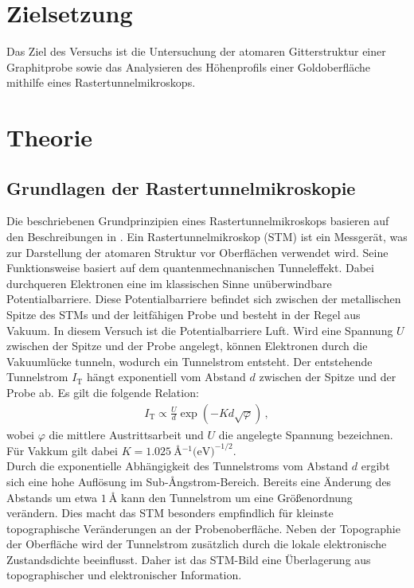 \section{Zielsetzung}
\label{sec:Zielsetzung}
Das Ziel des Versuchs ist die Untersuchung der atomaren Gitterstruktur einer Graphitprobe sowie das Analysieren des Höhenprofils einer Goldoberfläche mithilfe eines Rastertunnelmikroskops.

\section{Theorie}
\label{sec:Theorie}
\subsection{Grundlagen der Rastertunnelmikroskopie}
\label{sec:GrundlagenSTM}
Die beschriebenen Grundprinzipien eines Rastertunnelmikroskops basieren auf den Beschreibungen in \cite{Surfaces}.
Ein Rastertunnelmikroskop (STM) ist ein Messgerät, was zur Darstellung der atomaren Struktur vor Oberflächen verwendet wird.
Seine Funktionsweise basiert auf dem quantenmechnanischen Tunneleffekt. 
Dabei durchqueren Elektronen eine im klassischen Sinne unüberwindbare Potentialbarriere. 
Diese Potentialbarriere befindet sich zwischen der metallischen Spitze des STMs und der leitfähigen Probe und besteht in der Regel aus Vakuum. In diesem Versuch ist die Potentialbarriere Luft.
Wird eine Spannung $U$ zwischen der Spitze und der Probe angelegt, können Elektronen durch die Vakuumlücke tunneln, wodurch ein Tunnelstrom entsteht.
Der entstehende Tunnelstrom $I_{\text{T}}$ hängt exponentiell vom Abstand $d$ zwischen der Spitze und der Probe ab. Es gilt die folgende Relation:
\begin{align}
    I_{\text{T}} \propto \frac{U}{d}\exp\left(-K d \sqrt{\varphi}\right)\,, \label{eqn:Tunnelstrom}
\end{align}
wobei $\varphi$ die mittlere Austrittsarbeit und $U$ die angelegte Spannung bezeichnen. 
Für Vakkum gilt dabei $K = \SI{1.025}{\angstrom^{-1} (\eV)^{-1/2}}$.\\

Durch die exponentielle Abhängigkeit des Tunnelstroms vom Abstand $d$ ergibt sich eine hohe Auflösung im Sub-{\AA}ngstrom-Bereich. 
Bereits eine Änderung des Abstands um etwa $\SI{1}{\angstrom}$ kann den Tunnelstrom um eine Größenordnung verändern. Dies macht das STM besonders empfindlich für kleinste topographische Veränderungen an der Probenoberfläche.
Neben der Topographie der Oberfläche wird der Tunnelstrom zusätzlich durch die lokale elektronische Zustandsdichte beeinflusst. 
Daher ist das STM-Bild eine Überlagerung aus topographischer und elektronischer Information.\\

